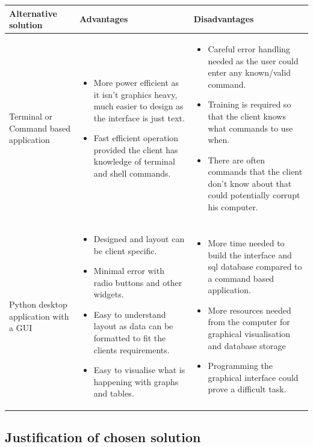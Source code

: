 \begin{center}
    \begin{tabular}{|p{3cm}|p{6cm}|p{6cm}|}
        \hline
        \textbf{Alternative solution} & \textbf{Advantages} & \textbf{Disadvantages}\\ \hline            
        Terminal or Command based application & \begin{itemize} \item More power efficient as it isn't graphics heavy, much easier to design as the interface is just text. \item Fast efficient operation provided the client has knowledge of terminal and shell commands. \end{itemize} & \begin{itemize} \item Careful error handling needed as the user could enter any known/valid command. \item Training is required so that the client knows what commands to use when. \item There are often commands that the client don't know about that could potentially corrupt his computer. \end{itemize}\\ \hline
        Python desktop application with a GUI & \begin{itemize} \item Designed and layout can be client specific. \item Minimal error with radio buttons and other widgets. \item Easy to understand layout as data can be formatted to fit the clients requirements. \item Easy to visualise what is happening with graphs and tables. \end{itemize} & \begin{itemize} \item More time needed to build the interface and sql database compared to a command based application. \item More resources needed from the computer for graphical visualisation and database storage \item Programming the graphical interface could prove a difficult task. \end{itemize}\\ \hline
    \end{tabular}
\end{center}


\subsection{Justification of chosen solution}

